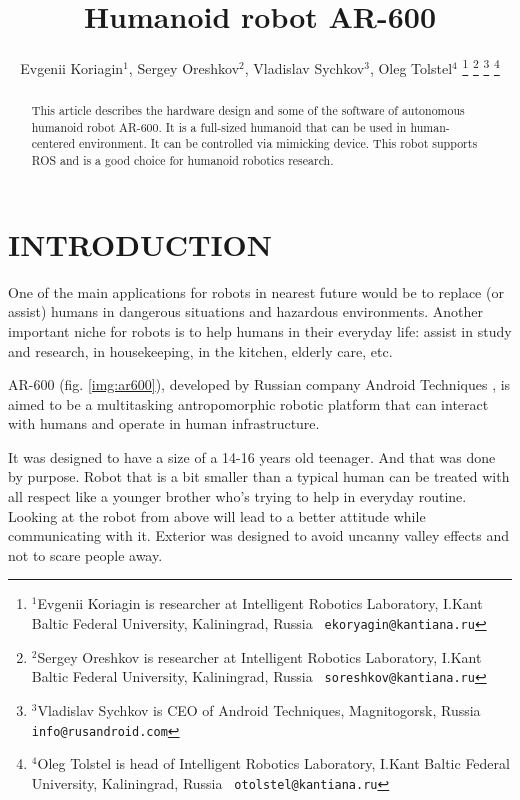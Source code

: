 \documentclass[letterpaper, 10 pt, conference]{ieeeconf}  %
\title{\LARGE \bf
Humanoid robot AR-600
}
\author{Evgenii Koriagin$^{1}$, Sergey Oreshkov$^{2}$, Vladislav
Sychkov$^{3}$, Oleg Tolstel$^{4}$%
\thanks{$^{1}$Evgenii Koriagin is researcher at Intelligent Robotics
Laboratory, I.Kant Baltic Federal University, Kaliningrad, Russia {\tt\small
ekoryagin@kantiana.ru}}%
\thanks{$^{2}$Sergey Oreshkov is researcher at Intelligent Robotics
Laboratory, I.Kant Baltic Federal University, Kaliningrad, Russia {\tt\small
soreshkov@kantiana.ru}}%
\thanks{$^{3}$Vladislav Sychkov is CEO of Android Techniques, Magnitogorsk,
Russia {\tt\small info@rusandroid.com}}%
\thanks{$^{4}$Oleg Tolstel is head of Intelligent Robotics
Laboratory, I.Kant Baltic Federal University, Kaliningrad, Russia {\tt\small
otolstel@kantiana.ru}}%
}
\begin{document}
\maketitle
\thispagestyle{empty}
\pagestyle{empty}


\begin{abstract}

This article describes the hardware design and some of the software of
autonomous humanoid robot AR-600. It is a full-sized humanoid that can be
used in human-centered environment. It can be controlled via
mimicking device. This robot supports ROS and is a good choice for
humanoid robotics research.

\end{abstract}


\section{INTRODUCTION}

One of the main applications for robots in nearest future would be to replace
(or assist) humans in dangerous situations and hazardous environments. Another
important niche for robots is to help humans in their everyday life: assist in
study and research, in housekeeping, in the kitchen, elderly care, etc.

AR-600 (fig. \ref{img:ar600}), developed by Russian company Android Techniques
\cite{c1}, is aimed to be a multitasking antropomorphic robotic platform that
can interact with humans and operate in human infrastructure. 
   
It was designed to have a size of a 14-16 years old teenager. And that was done
by purpose. Robot that is a bit smaller than a typical human can be treated
with all respect like a younger brother who's trying to help in everyday
routine. Looking at the robot from above will lead to a better attitude
while communicating with it. Exterior was designed to avoid uncanny valley
effects and not to scare people away.
  
\end{document}
